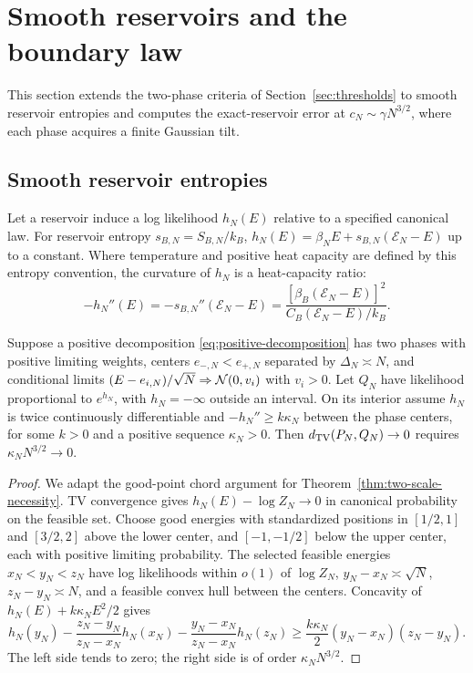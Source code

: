 \section{Smooth reservoirs and the boundary law}
\label{sec:boundary-smooth}

This section extends the two-phase criteria of
Section~\ref{sec:thresholds} to smooth reservoir entropies and computes
the exact-reservoir error at $c_N\sim\gamma N^{3/2}$, where each phase
acquires a finite Gaussian tilt.

\subsection{Smooth reservoir entropies}

Let a reservoir induce a log likelihood $h_N(E)$ relative to a
specified canonical law. For reservoir entropy $s_{B,N}=S_{B,N}/k_B$,
$h_N(E)=\beta_NE+s_{B,N}(\mathcal E_N-E)$ up to a constant. Where
temperature and positive heat capacity are defined by this entropy
convention, the curvature of $h_N$ is a heat-capacity ratio:
\begin{equation}
 -h_N''(E)=-s_{B,N}''(\mathcal E_N-E)
 =\frac{[\beta_B(\mathcal E_N-E)]^2}{C_B(\mathcal E_N-E)/k_B}.
 \label{eq:smooth-capacity}
\end{equation}

\begin{proposition}
\label{prop:smooth-necessity}
Suppose a positive decomposition \eqref{eq:positive-decomposition}
has two phases with positive limiting weights, centers
$e_{-,N}<e_{+,N}$ separated by $\Delta_N\asymp N$, and conditional
limits $(E-e_{i,N})/\sqrt N\Rightarrow\mathcal N(0,v_i)$ with $v_i>0$.
Let $Q_N$ have likelihood proportional to $e^{h_N}$, with $h_N=-\infty$
outside an interval. On its interior assume $h_N$ is twice continuously
differentiable and $-h_N''\ge k\kappa_N$ between the phase centers,
for some $k>0$ and a positive sequence $\kappa_N>0$.
Then $d_{\mathrm{TV}}(P_N,Q_N)\to0$ requires $\kappa_NN^{3/2}\to0$.
\end{proposition}
\begin{proof}
We adapt the good-point chord argument for
Theorem~\ref{thm:two-scale-necessity}.
TV convergence gives $h_N(E)-\log Z_N\to0$ in canonical probability
on the feasible set. Choose good energies with standardized positions
in $[1/2,1]$ and $[3/2,2]$ above the lower center, and $[-1,-1/2]$
below the upper center, each with positive limiting probability.
The selected feasible energies $x_N<y_N<z_N$ have log likelihoods
within $o(1)$ of $\log Z_N$, $y_N-x_N\asymp\sqrt N$, $z_N-y_N\asymp N$,
and a feasible convex hull between the centers.
Concavity of $h_N(E)+k\kappa_NE^2/2$ gives
\[
 h_N(y_N)-\frac{z_N-y_N}{z_N-x_N}h_N(x_N)
 -\frac{y_N-x_N}{z_N-x_N}h_N(z_N)
 \ge \frac{k\kappa_N}{2}(y_N-x_N)(z_N-y_N).
\]
The left side tends to zero; the right side is of order
$\kappa_NN^{3/2}$.
\end{proof}

